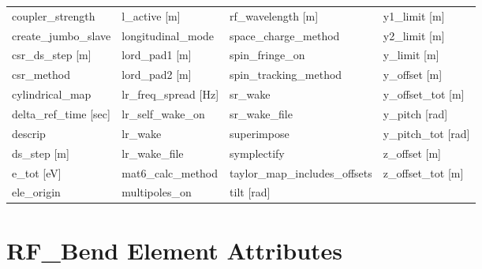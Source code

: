 \begin{tabular}{llll}
coupler_strength                 & l_active [m]                     & rf_wavelength [m]                & y1_limit [m]                     \\
create_jumbo_slave               & longitudinal_mode                & space_charge_method              & y2_limit [m]                     \\
csr_ds_step [m]                  & lord_pad1 [m]                    & spin_fringe_on                   & y_limit [m]                      \\
csr_method                       & lord_pad2 [m]                    & spin_tracking_method             & y_offset [m]                     \\
cylindrical_map                  & lr_freq_spread [Hz]              & sr_wake                          & y_offset_tot [m]                 \\
delta_ref_time [sec]             & lr_self_wake_on                  & sr_wake_file                     & y_pitch [rad]                    \\
descrip                          & lr_wake                          & superimpose                      & y_pitch_tot [rad]                \\
ds_step [m]                      & lr_wake_file                     & symplectify                      & z_offset [m]                     \\
e_tot [eV]                       & mat6_calc_method                 & taylor_map_includes_offsets      & z_offset_tot [m]                 \\
ele_origin                       & multipoles_on                    & tilt [rad]                       &                                  \\
 \bottomrule
 \end{tabular}
 \vfill
 
 \section{RF_Bend Element Attributes}
 \label{s:list.rf.bend}
 
